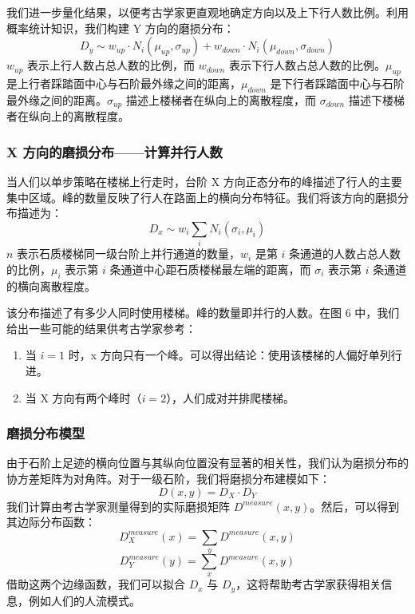 \documentclass[11pt,a4paper]{ctexart}
\begin{document}
我们进一步量化结果，以便考古学家更直观地确定方向以及上下行人数比例。利用概率统计知识，我们构建 Y 方向的磨损分布：
\begin{equation}
D_y\sim w_{up}\cdot N_i(\mu_{up},\sigma_{up})+w_{down}\cdot N_i(\mu_{down},\sigma_{down}) \tag{3.11}
\end{equation}
\(w_{up}\) 表示上行人数占总人数的比例，而 \(w_{down}\) 表示下行人数占总人数的比例。\(\mu_{up}\) 是上行者踩踏面中心与石阶最外缘之间的距离，\(\mu_{down}\) 是下行者踩踏面中心与石阶最外缘之间的距离。\(\sigma_{up}\) 描述上楼梯者在纵向上的离散程度，而 \(\sigma_{down}\) 描述下楼梯者在纵向上的离散程度。

\subsubsection{X 方向的磨损分布——计算并行人数}

当人们以单步策略在楼梯上行走时，台阶 X 方向正态分布的峰描述了行人的主要集中区域。峰的数量反映了行人在路面上的横向分布特征。我们将该方向的磨损分布描述为：
\begin{equation}
D_x\sim w_i\sum_i N_i(\sigma_i,\mu_i) \tag{3.12}
\end{equation}
\(n\) 表示石质楼梯同一级台阶上并行通道的数量，\(w_i\) 是第 \(i\) 条通道的人数占总人数的比例，\(\mu_i\) 表示第 \(i\) 条通道中心距石质楼梯最左端的距离，而 \(\sigma_i\) 表示第 \(i\) 条通道的横向离散程度。

该分布描述了有多少人同时使用楼梯。峰的数量即并行的人数。在图 6 中，我们给出一些可能的结果供考古学家参考：

\begin{enumerate}
\item 当 \(i=1\) 时，x 方向只有一个峰。可以得出结论：使用该楼梯的人偏好单列行进。
\item 当 X 方向有两个峰时（\(i=2\)），人们成对并排爬楼梯。
\end{enumerate}

\subsubsection{磨损分布模型}

由于石阶上足迹的横向位置与其纵向位置没有显著的相关性，我们认为磨损分布的协方差矩阵为对角阵。对于一级石阶，我们将磨损分布建模如下：
\begin{equation}
D(x,y)=D_X\cdot D_Y \tag{3.13}
\end{equation}
我们计算由考古学家测量得到的实际磨损矩阵 \(D^{measure}(x,y)\)。然后，可以得到其边际分布函数：
\begin{equation}
D_X^{measure}(x)=\sum_y D^{measure}(x,y) \tag{3.14}
\end{equation}
\begin{equation}
D_Y^{measure}(y)=\sum_x D^{measure}(x,y) \tag{3.15}
\end{equation}
借助这两个边缘函数，我们可以拟合 \(D_x\) 与 \(D_y\)，这将帮助考古学家获得相关信息，例如人们的人流模式。
\end{document}
